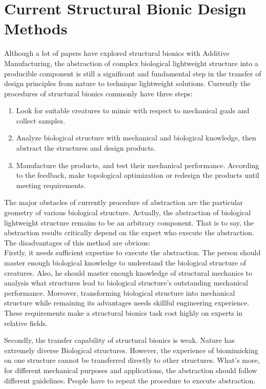 \section{Current Structural Bionic Design Methods}
Although a lot of papers have explored structural bionics with Additive Manufacturing, the abstraction of complex biological lightweight structure into a producible component is still a significant and fundamental step in the transfer of design principles from nature to technique lightweight solutions. Currently the procedures of structural bionics commonly have three steps:\\
\begin{enumerate}
\item Look for suitable creatures to mimic with respect to mechanical goals and collect samples.

\item Analyze biological structure with mechanical and biological knowledge, then abstract the structures and design products.

\item Manufacture the products, and test their mechanical performance. According to the feedback, make topological optimization or redesign the products until meeting requirements.\\
\end{enumerate}

The major obstacles of currently procedure of abstraction are the particular geometry of various biological structure. Actually, the abstraction of biological lightweight structure remains to be an arbitrary component. That is to say, the abstraction results critically depend on the expert who execute the abstraction. The disadvantages of this method are obvious:\\

Firstly, it needs sufficient expertise to execute the abstraction. The person should master enough biological knowledge to understand the biological structure of creatures. Also, he should master enough knowledge of structural mechanics to analysis what structures lead to biological structure’s outstanding mechanical performance. Moreover, transforming biological structure into mechanical structure while remaining its advantages needs skillful engineering experience. These requirements make a structural bionics task cost highly on experts in relative fields.

Secondly, the transfer capability of structural bionics is weak. Nature has extremely diverse Biological structures. However, the experience of biomimicking on one structure cannot be transferred directly to other structures. What’s more, for different mechanical purposes and applications, the abstraction should follow different guidelines. People have to repeat the procedure to execute abstraction.

